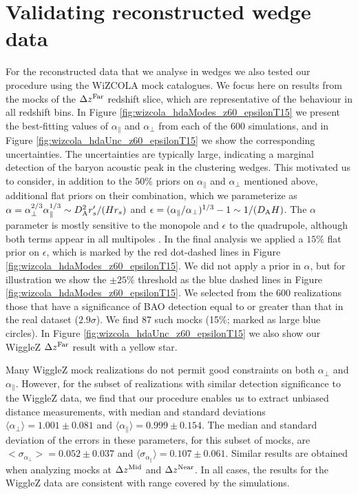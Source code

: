 \documentclass[iop,twocolappendix]{emulateapj}
\begin{document}
\section{Validating reconstructed wedge data}

For the reconstructed data that we analyse in wedges we also tested our procedure using the WiZCOLA mock catalogues.  We focus
here on results from the mocks of the $\Delta z^{\rm Far}$ redshift
slice, which are representative of the behaviour in all redshift bins.
In Figure \ref{fig:wizcola_hdaModes_z60_epsilonT15} we present the
best-fitting values of $\alpha_\parallel$ and $\alpha_\perp$ from each
of the 600 simulations, and in Figure
\ref{fig:wizcola_hdaUnc_z60_epsilonT15} we show the corresponding
uncertainties.  The uncertainties are typically large, indicating a
marginal detection of the baryon acoustic peak in the clustering
wedges.  This motivated us to consider, in addition to the $50\%$
priors on $\alpha_\parallel$ and $\alpha_\perp$ mentioned above,
additional flat priors on their combination, which we parameterize as
$\alpha = \alpha_\perp^{2/3} \alpha_\parallel^{1/3} \sim D_{\rm
  A}^2 r^\prime_s /(H r_s)$ and $\epsilon = (\alpha_\parallel/\alpha_\perp)^{1/3} - 1
\sim 1/(D_{\rm A} H)$.
The $\alpha$ parameter is mostly sensitive to
the monopole and $\epsilon$ to the quadrupole, although both terms appear in all
multipoles \citep[see][for a discussion]{PadmanabhanWhite2008}. In the
final analysis we applied a $15\%$ flat prior on $\epsilon$, which is
marked by the red dot-dashed lines in Figure
\ref{fig:wizcola_hdaModes_z60_epsilonT15}.  We did not apply a prior
in $\alpha$, but for illustration we show the $\pm 25\%$ threshold as
the blue dashed lines in Figure
\ref{fig:wizcola_hdaModes_z60_epsilonT15}.  We selected from the 600
realizations those that have a significance of BAO detection equal to
or greater than that in the real dataset ($2.9\sigma$).  We find 87
such mocks (15\%; marked as large blue circles).  In Figure
\ref{fig:wizcola_hdaUnc_z60_epsilonT15} we also show our WiggleZ
$\Delta z^{\rm Far}$ result with a yellow star.

Many WiggleZ mock realizations do not permit good constraints on both
$\alpha_\perp$ and $\alpha_\parallel$.  However, for the subset of
realizations with similar detection significance to the WiggleZ data,
we find that our procedure enables us to extract unbiased distance
measurements, with median and standard deviations $\langle \alpha_\perp \rangle =
1.001 \pm 0.081$ and $\langle \alpha_\parallel \rangle = 0.999 \pm 0.154$.  The
median and standard deviation of the errors in these parameters, for
this subset of mocks, are $<\sigma_{\alpha_\perp}> = 0.052 \pm 0.037$
and $\langle \sigma_{\alpha_\parallel} \rangle = 0.107 \pm 0.061$.  Similar results
are obtained when analyzing mocks at $\Delta z^{\rm Mid}$ and $\Delta
z^{\rm Near}$.  In all cases, the results for the WiggleZ data are
consistent with range covered by the simulations.
\end{document}
